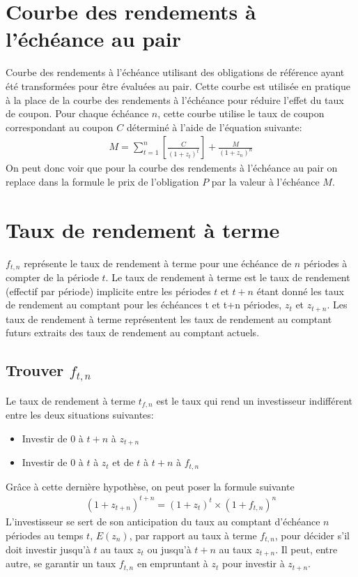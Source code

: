 \documentclass[letterpaper, 12pt]{article}
\newcommand{\1}{\mathds{1}}	%
\theoremstyle{definition}
\begin{document}
\section{Courbe des rendements à l’échéance au pair}
Courbe des rendements à l’échéance utilisant des obligations de référence ayant été transformées pour être évaluées au pair.  Cette courbe est utilisée en pratique à la place de la courbe des rendements à l’échéance pour réduire l’effet du taux de coupon.  Pour chaque échéance $n$,  cette courbe utilise le taux de coupon correspondant au coupon $C$ déterminé à l’aide de l’équation suivante:
\begin{align*}
M=\sum_{t=1}^n \left[ \frac{C}{(1+z_t)^t} \right]+\frac{M}{(1+z_n)^{n}}
\end{align*} 
On peut donc voir que pour la courbe des rendements à l’échéance au pair on replace dans la formule le prix de l'obligation $P$ par la valeur à l'échéance $M$.

\section{Taux de rendement à terme}
$f_{t,n}$ représente le taux de rendement à terme pour une échéance de $n$ périodes à compter de la période $t$.  Le taux de rendement à terme est le taux de rendement (effectif par période) implicite entre les périodes $t$ et $t+n$ étant donné les taux de rendement au comptant pour les échéances t et t+n périodes,  $z_t$ et $z_{t+n}$.  Les taux de rendement à terme représentent les taux de rendement au comptant futurs extraits des taux de rendement au comptant actuels.
\subsection{Trouver $f_{t,n}$}
Le taux de rendement à terme $t_{f,n}$ est le taux qui rend un investisseur indifférent entre les deux situations suivantes:
\begin{itemize}
\item Investir de $0$ à $t+n$ à $z_{t+n}$
\item Investir de $0$ à $t$ à $z_t$ et de $t$ à $t+n$ à $f_{t,n}$
\end{itemize}
Grâce à cette dernière hypothèse, on peut poser la formule suivante
\begin{align*}
(1+z_{t+n})^{t+n}=(1+z_t)^t \times (1+f_{t,n})^n
\end{align*}
L’investisseur se sert de son anticipation du taux au comptant d’échéance $n$ périodes au temps $t$,  $E(z_n)$,  par rapport au taux à terme $f_{t,n}$,  pour décider s’il doit investir jusqu’à $t$ au taux $z_t$ ou jusqu’à $t+n$ au taux $z_{t+n}$.  Il peut,  entre autre,  se garantir un taux $f_{t,n}$ en empruntant à $z_t$ pour investir à $z_{t+n}$.
\newpage
\end{document}
